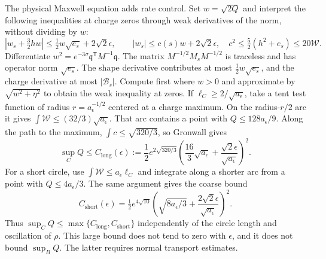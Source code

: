 \documentclass[a4paper,11pt]{article}
\numberwithin{equation}{section}
\theoremstyle{definition}
\begin{document}
The physical Maxwell equation adds rate control.
Set $w=\sqrt{2Q}$ and interpret the following inequalities at charge zeros through weak derivatives of the norm, without dividing by $w$:
\[
 |w_s+\tfrac32hw|\le\tfrac12w\sqrt{e_s}+2\sqrt2\epsilon,
 \qquad
 |w_s|\le c(s)w+2\sqrt2\epsilon,
 \quad c^2\le\tfrac52(h^2+e_s)\le20\mathcal W.
\]
Differentiate $w^2=e^{-3\sigma}\mathfrak q^{\mathsf T}M^{-1}\mathfrak q$.
The matrix $M^{-1/2}M_sM^{-1/2}$ is traceless and has operator norm $\sqrt{e_s}$.
The shape derivative contributes at most $\frac12w\sqrt{e_s}$, and the charge derivative at most $|\mathscr B_s|$.
Compute first where $w>0$ and approximate by $\sqrt{w^2+\eta^2}$ to obtain the weak inequality at zeros.
If $\ell_C\ge2/\sqrt{a_\epsilon}$, take a tent test function of radius $r=a_\epsilon^{-1/2}$ centered at a charge maximum.
On the radius-$r/2$ arc it gives $\int\mathcal W\le(32/3)\sqrt{a_\epsilon}$.
That arc contains a point with $Q\le128a_\epsilon/9$.
Along the path to the maximum, $\int c\le\sqrt{320/3}$, so Gronwall gives
\begin{equation}\label{eq:separator-Q-bound}
 \sup_CQ\le C_{\mathrm{long}}(\epsilon):=
 \frac12e^{2\sqrt{320/3}}
 \left(\frac{16}{3}\sqrt{a_\epsilon}
       +\frac{\sqrt2\epsilon}{\sqrt{a_\epsilon}}\right)^2.
\end{equation}
For a short circle, use $\int\mathcal W\le a_\epsilon\ell_C$ and integrate along a shorter arc from a point with $Q\le4a_\epsilon/3$.
The same argument gives the coarse bound
\[
 C_{\mathrm{short}}(\epsilon)=\tfrac12e^{4\sqrt{10}}
 \left(\sqrt{8a_\epsilon/3}
       +\frac{2\sqrt2\epsilon}{\sqrt{a_\epsilon}}\right)^2.
\]
Thus $\sup_CQ\le\max\{C_{\mathrm{long}},C_{\mathrm{short}}\}$ independently of the circle length and oscillation of $\rho$.
This large bound does not tend to zero with $\epsilon$, and it does not bound $\sup_BQ$.
The latter requires normal transport estimates.
\end{document}
